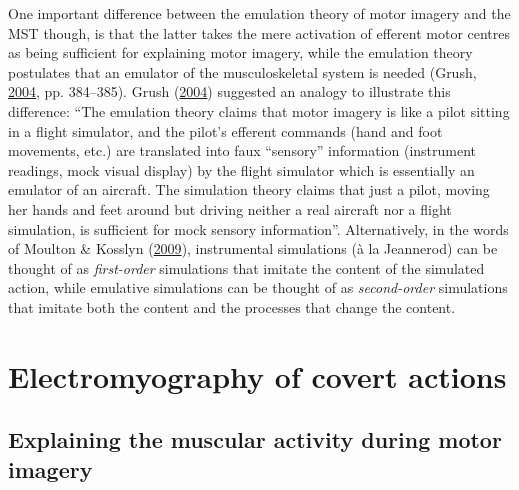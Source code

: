 \documentclass[a4paper,12pt,twoside,openright,oldfontcommands]{memoir}
\begin{document}
One important difference between the emulation theory of motor imagery
and the MST though, is that the latter takes the mere activation of
efferent motor centres as being sufficient for explaining motor imagery,
while the emulation theory postulates that an emulator of the
musculoskeletal system is needed (Grush,
\protect\hyperlink{ref-grush_emulation_2004}{2004}, pp. 384--385). Grush
(\protect\hyperlink{ref-grush_emulation_2004}{2004}) suggested an
analogy to illustrate this difference: ``The emulation theory claims
that motor imagery is like a pilot sitting in a flight simulator, and
the pilot's efferent commands (hand and foot movements, etc.) are
translated into faux ``sensory'' information (instrument readings, mock
visual display) by the flight simulator which is essentially an emulator
of an aircraft. The simulation theory claims that just a pilot, moving
her hands and feet around but driving neither a real aircraft nor a
flight simulation, is sufficient for mock sensory information''.
Alternatively, in the words of Moulton \& Kosslyn
(\protect\hyperlink{ref-moulton_imagining_2009}{2009}), instrumental
simulations (à la Jeannerod) can be thought of as \emph{first-order}
simulations that imitate the content of the simulated action, while
emulative simulations can be thought of as \emph{second-order}
simulations that imitate both the content and the processes that change
the content.

\section{Electromyography of covert actions}\label{emg}

\subsection{Explaining the muscular activity during motor
imagery}\label{explaining-the-muscular-activity-during-motor-imagery}
\end{document}
